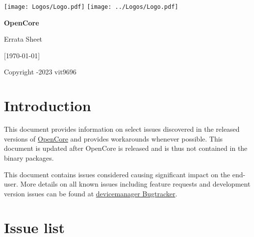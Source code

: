 \documentclass[]{article}
\begin{document}
\begin{titlepage}
   \begin{center}
       \vspace*{2.0in}

       \Huge

         {\texttt{[image: Logos/Logo.pdf]}}
         {\texttt{[image: ../Logos/Logo.pdf]}}

       \sffamily

       \textbf{OpenCore}

       \vspace{0.2in}

       Errata Sheet

       \vspace{0.2in}

        {[}\today{]}

       \normalsize

       \vfill

       \rmfamily

       Copyright -2023 vit9696

   \end{center}
\end{titlepage}

\section{Introduction}\label{introduction}

This document provides information on select issues discovered in the released
versions of \href{https://github.com/devicemanager/OpenCorePkg}{OpenCore}
and provides workarounds whenever possible. This document is updated
after OpenCore is released and is thus not contained in the binary packages.

This document contains issues considered causing significant impact on the end-user.
More details on all known issues including feature requests and development version issues
can be found at \href{https://github.com/devicemanager/bugtracker}{devicemanager Bugtracker}.

\section{Issue list}\label{issuelist}
\end{document}
